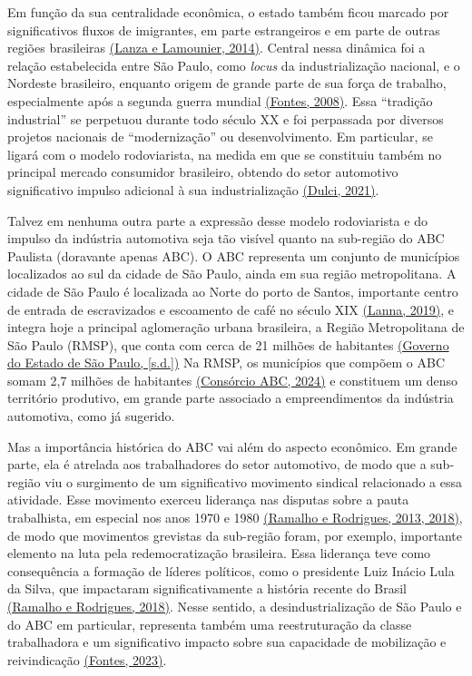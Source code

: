 Em função da sua centralidade econômica, o estado também ficou marcado
por significativos fluxos de imigrantes, em parte estrangeiros e em
parte de outras regiões brasileiras
\href{https://www.zotero.org/google-docs/?Q9aFbc}{(Lanza e Lamounier,
2014)}. Central nessa dinâmica foi a relação estabelecida entre São
Paulo, como \emph{locus} da industrialização nacional, e o Nordeste
brasileiro, enquanto origem de grande parte de sua força de trabalho,
especialmente após a segunda guerra mundial
\href{https://www.zotero.org/google-docs/?MI4Xs4}{(Fontes, 2008)}. Essa
``tradição industrial'' se perpetuou durante todo século XX e foi
perpassada por diversos projetos nacionais de ``modernização'' ou
desenvolvimento. Em particular, se ligará com o modelo rodoviarista, na
medida em que se constituiu também no principal mercado consumidor
brasileiro, obtendo do setor automotivo significativo impulso adicional
à sua industrialização
\href{https://www.zotero.org/google-docs/?I30f5z}{(Dulci, 2021)}.

Talvez em nenhuma outra parte a expressão desse modelo rodoviarista e do
impulso da indústria automotiva seja tão visível quanto na sub-região do
ABC Paulista (doravante apenas ABC). O ABC representa um conjunto de
municípios localizados ao sul da cidade de São Paulo, ainda em sua
região metropolitana. A cidade de São Paulo é localizada ao Norte do
porto de Santos, importante centro de entrada de escravizados e
escoamento de café no século XIX
\href{https://www.zotero.org/google-docs/?yNmXPa}{(Lanna, 2019)}, e
integra hoje a principal aglomeração urbana brasileira, a Região
Metropolitana de São Paulo (RMSP), que conta com cerca de 21 milhões de
habitantes \href{https://www.zotero.org/google-docs/?SCF7Gb}{(Governo do
Estado de São Paulo, {[}s.d.{]})} Na RMSP, os municípios que compõem o
ABC somam 2,7 milhões de habitantes
\href{https://www.zotero.org/google-docs/?hUGjhR}{(Consórcio ABC, 2024)}
e constituem um denso território produtivo, em grande parte associado a
empreendimentos da indústria automotiva, como já sugerido.

Mas a importância histórica do ABC vai além do aspecto econômico. Em
grande parte, ela é atrelada aos trabalhadores do setor automotivo, de
modo que a sub-região viu o surgimento de um significativo movimento
sindical relacionado a essa atividade. Esse movimento exerceu liderança
nas disputas sobre a pauta trabalhista, em especial nos anos 1970 e 1980
\href{https://www.zotero.org/google-docs/?6z3SJT}{(Ramalho e Rodrigues,
2013, 2018)}, de modo que movimentos grevistas da sub-região foram, por
exemplo, importante elemento na luta pela redemocratização brasileira.
Essa liderança teve como consequência a formação de líderes políticos,
como o presidente Luiz Inácio Lula da Silva, que impactaram
significativamente a história recente do Brasil
\href{https://www.zotero.org/google-docs/?do1NWN}{(Ramalho e Rodrigues,
2018)}. Nesse sentido, a desindustrialização de São Paulo e do ABC em
particular, representa também uma reestruturação da classe trabalhadora
e um significativo impacto sobre sua capacidade de mobilização e
reivindicação \href{https://www.zotero.org/google-docs/?X2RzFf}{(Fontes,
2023)}.


